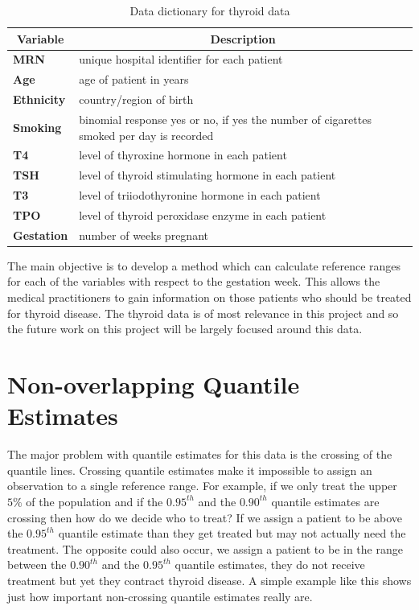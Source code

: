 \documentclass[12pt,a4paper]{report}
\begin{document}
\begin{table}[ht]
\begin{center}
\begin{tabular}{|p{2.5cm}p{10cm}|}\hline
\multicolumn{1}{|c}{\textbf{Variable}}&\multicolumn{1}{c|}{\textbf{Description}}\tabularnewline
\hline\hline
\textbf{MRN}&unique hospital identifier for each patient \tabularnewline
\textbf{Age}&age of patient in years \tabularnewline
\textbf{Ethnicity}&country/region of birth \tabularnewline
\textbf{Smoking}&binomial response yes or no, if yes the number of cigarettes smoked per day is recorded \tabularnewline
\textbf{T4}&level of thyroxine hormone in each patient \tabularnewline
\textbf{TSH}&level of thyroid stimulating hormone in each patient \tabularnewline
\textbf{T3}&level of triiodothyronine hormone in each patient \tabularnewline
\textbf{TPO}&level of thyroid peroxidase enzyme in each patient \tabularnewline
\textbf{Gestation}&number of weeks pregnant \tabularnewline
\hline
\end{tabular}
\end{center}
\caption{Data dictionary for thyroid data}
\label{table:sampledatadict}
\end{table}

The main objective is to develop a method which can calculate reference ranges for each of the variables with respect to the gestation week. This allows the medical practitioners to gain information on those patients who should be treated for thyroid disease. The thyroid data is of most relevance in this project and so the future work on this project will be largely focused around this data.

\section{Non-overlapping Quantile Estimates}
The major problem with quantile estimates for this data is the crossing of the quantile lines. Crossing quantile estimates make it impossible to assign an observation to a single reference range. For example, if we only treat the upper $5\%$ of the population and if the $0.95^{th}$ and the $0.90^{th}$ quantile estimates are crossing then how do we decide who to treat? If we assign a patient to be above the $0.95^{th}$ quantile estimate than they get treated but may not actually need the treatment. The opposite could also occur, we assign a patient to be in the range between the $0.90^{th}$ and the $0.95^{th}$ quantile estimates, they do not receive treatment but yet they contract thyroid disease. A simple example like this shows just how important non-crossing quantile estimates really are.
\end{document}

